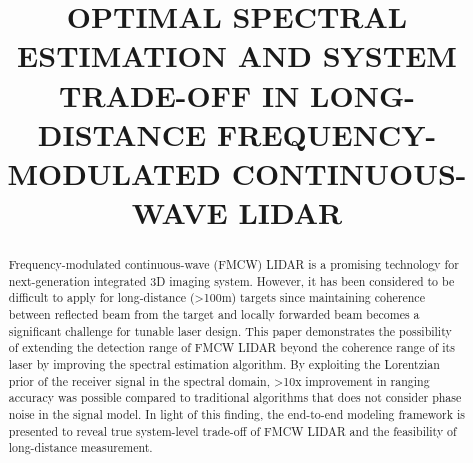 \documentclass{article}
\title{
OPTIMAL SPECTRAL ESTIMATION AND SYSTEM TRADE-OFF IN LONG-DISTANCE FREQUENCY-MODULATED CONTINUOUS-WAVE LIDAR
}
\begin{document}
\ninept

\maketitle

\begin{abstract}
Frequency-modulated continuous-wave (FMCW) LIDAR is a promising technology for next-generation integrated 3D imaging system. However, it has been considered to be difficult to apply for long-distance (\textgreater 100m) targets since maintaining coherence between reflected beam from the target and locally forwarded beam becomes a significant challenge for tunable laser design. This paper demonstrates the possibility of extending the detection range of FMCW LIDAR beyond the coherence range of its laser by improving the spectral estimation algorithm. By exploiting the Lorentzian prior of the receiver signal in the spectral domain, \textgreater 10x improvement in ranging accuracy was possible compared to traditional algorithms that does not consider phase noise in the signal model. In light of this finding, the end-to-end modeling framework is presented to reveal true system-level trade-off of FMCW LIDAR and the feasibility of long-distance measurement.



\end{abstract}
\end{document}
